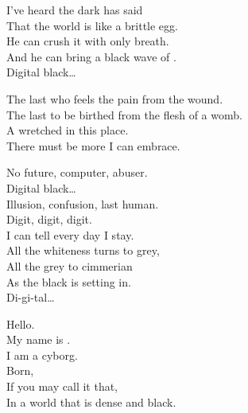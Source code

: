 I've heard the dark  has said \\
That the world is like a brittle egg. \\
He can crush it with only breath. \\
And he can bring a black wave of . \\

Digital black… \\


The last who feels the pain from the wound. \\
The last to be birthed from the flesh of a womb. \\

A wretched  in this  place. \\
There must be more I can embrace. \\


No future, computer, abuser. \\

Digital black… \\

Illusion, confusion, last human. \\

Digit, digit, digit. \\

I can tell every day I stay. \\
All the whiteness turns to grey, \\
All the grey to cimmerian \\
As the black is setting in. \\

Di-gi-tal… \\





Hello. \\
My name is . \\
I am a cyborg. \\

Born, \\
If you may call it that, \\
In a world that is dense and black. \\

